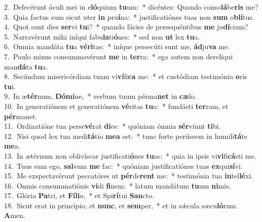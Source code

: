 {2.~}Defecérunt óculi mei in e\textbf{ló}quium \textbf{tu}um:~* dicéntes: Quando conso\textbf{lá}be\textbf{ris} me?\\
{3.~}Quia factus sum sicut uter \textbf{in} pru\textbf{í}na:~* justificatiónes tuas non \textbf{sum} o\textbf{blí}tus.\\
{4.~}Quot sunt dies \textbf{ser}vi \textbf{tu}i?~* quando fácies de persequéntibus \textbf{me} ju\textbf{dí}cium?\\
{5.~}Narravérunt mihi iníqui fabu\textbf{la}ti\textbf{ó}nes:~* sed non \textbf{ut} lex \textbf{tu}a.\\
{6.~}Omnia mandáta \textbf{tu}a \textbf{vé}\textbf{ri}tas:~* iníque persecúti sunt me, \textbf{ád}ju\textbf{va} me.\\
{7.~}Paulo minus consummavérunt \textbf{me} in \textbf{ter}ra:~* ego autem non derelíqui man\textbf{dá}ta \textbf{tu}a.\\
{8.~}Secúndum misericórdiam tuam vi\textbf{ví}fi\textbf{ca} me:~* et custódiam testimónia \textbf{o}ris \textbf{tu}i.\\
{9.~}In æ\textbf{tér}num, \textbf{Dó}\textbf{mi}ne,~* verbum tuum pérma\textbf{net} in \textbf{cæ}lo.\\
{10.~}In generatiónem et generatiónem \textbf{vé}ritas \textbf{tu}a:~* fundásti \textbf{ter}ram, et \textbf{pér}manet.\\
{11.~}Ordinatióne tua perse\textbf{vé}rat \textbf{di}es:~* quóniam ómnia \textbf{sér}viunt \textbf{ti}bi.\\
{12.~}Nisi quod lex tua medi\textbf{tá}tio \textbf{me}\textbf{a} est:~* tunc forte periíssem in humili\textbf{tá}te \textbf{me}a.\\
{13.~}In ætérnum non oblivíscar justificati\textbf{ó}nes \textbf{tu}as:~* quia in ipsis vi\textbf{vi}fi\textbf{cá}sti me.\\
{14.~}Tuus sum ego, \textbf{sal}vum \textbf{me} fac:~* quóniam justificatiónes tuas \textbf{ex}qui\textbf{sí}vi.\\
{15.~}Me exspectavérunt peccatóres ut \textbf{pér}de\textbf{rent} me:~* testimónia tua \textbf{in}tel\textbf{lé}xi.\\
{16.~}Omnis consummatiónis \textbf{vi}di \textbf{fi}nem:~* latum mandátum \textbf{tu}um \textbf{ni}mis.\\
{17.~}Glória \textbf{Pa}tri, et \textbf{Fí}\textbf{li}o,~* et Spi\textbf{rí}tui \textbf{San}cto.\\
{18.~}Sicut erat in princípio, et \textbf{nunc}, et \textbf{sem}per,~* et in sǽcula sæcu\textbf{ló}rum. \textbf{A}men.\\
